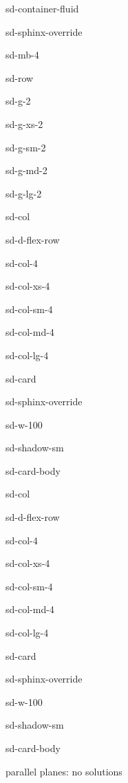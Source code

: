\documentclass[letterpaper,10pt,english]{jupyterBook}
\begin{document}
\begin{sphinxuseclass}{sd-container-fluid}
\begin{sphinxuseclass}{sd-sphinx-override}
\begin{sphinxuseclass}{sd-mb-4}
\begin{sphinxuseclass}{sd-row}
\begin{sphinxuseclass}{sd-g-2}
\begin{sphinxuseclass}{sd-g-xs-2}
\begin{sphinxuseclass}{sd-g-sm-2}
\begin{sphinxuseclass}{sd-g-md-2}
\begin{sphinxuseclass}{sd-g-lg-2}
\begin{sphinxuseclass}{sd-col}
\begin{sphinxuseclass}{sd-d-flex-row}
\begin{sphinxuseclass}{sd-col-4}
\begin{sphinxuseclass}{sd-col-xs-4}
\begin{sphinxuseclass}{sd-col-sm-4}
\begin{sphinxuseclass}{sd-col-md-4}
\begin{sphinxuseclass}{sd-col-lg-4}
\begin{sphinxuseclass}{sd-card}
\begin{sphinxuseclass}{sd-sphinx-override}
\begin{sphinxuseclass}{sd-w-100}
\begin{sphinxuseclass}{sd-shadow-sm}
\begin{sphinxuseclass}{sd-card-body}
\end{sphinxuseclass}
\end{sphinxuseclass}
\end{sphinxuseclass}
\end{sphinxuseclass}
\end{sphinxuseclass}
\end{sphinxuseclass}
\end{sphinxuseclass}
\end{sphinxuseclass}
\end{sphinxuseclass}
\end{sphinxuseclass}
\end{sphinxuseclass}
\end{sphinxuseclass}
\begin{sphinxuseclass}{sd-col}
\begin{sphinxuseclass}{sd-d-flex-row}
\begin{sphinxuseclass}{sd-col-4}
\begin{sphinxuseclass}{sd-col-xs-4}
\begin{sphinxuseclass}{sd-col-sm-4}
\begin{sphinxuseclass}{sd-col-md-4}
\begin{sphinxuseclass}{sd-col-lg-4}
\begin{sphinxuseclass}{sd-card}
\begin{sphinxuseclass}{sd-sphinx-override}
\begin{sphinxuseclass}{sd-w-100}
\begin{sphinxuseclass}{sd-shadow-sm}
\begin{sphinxuseclass}{sd-card-body}
\begin{figure}[htbp]
\centering

\noindent{}
\end{figure}

 parallel planes: no solutions


\end{sphinxuseclass}
\end{sphinxuseclass}
\end{sphinxuseclass}
\end{sphinxuseclass}
\end{sphinxuseclass}
\end{sphinxuseclass}
\end{sphinxuseclass}
\end{sphinxuseclass}
\end{sphinxuseclass}
\end{sphinxuseclass}
\end{sphinxuseclass}
\end{sphinxuseclass}
\end{sphinxuseclass}
\end{sphinxuseclass}
\end{sphinxuseclass}
\end{sphinxuseclass}
\end{sphinxuseclass}
\end{sphinxuseclass}
\end{sphinxuseclass}
\end{sphinxuseclass}
\end{sphinxuseclass}
\end{document}
